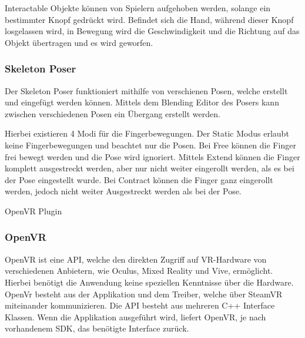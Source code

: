 \begin{itemize}
Interactable Objekte können von Spielern aufgehoben werden, solange ein bestimmter Knopf gedrückt wird.
Befindet sich die Hand, während dieser Knopf losgelassen wird, in Bewegung wird die Geschwindigkeit und die Richtung auf das Objekt übertragen und es wird geworfen.
~\cite{SteamVR_Interaction_System_2022}

\subsubsection{Skeleton Poser}
Der Skeleton Poser funktioniert mithilfe von verschienen Posen, welche erstellt und eingefügt werden können.
Mittels dem Blending Editor des Posers kann zwischen verschiedenen Posen ein Übergang erstellt werden.

Hierbei existieren 4 Modi für die Fingerbewegungen.
Der Static Modus erlaubt keine Fingerbewegungen und beachtet nur die Posen.
Bei Free können die Finger frei bewegt werden und die Pose wird ignoriert.
Mittels Extend können die Finger komplett ausgestreckt werden, aber nur nicht weiter eingerollt werden, als es bei der Pose eingestellt wurde.
Bei Contract können die Finger ganz eingerollt werden, jedoch nicht weiter Ausgestreckt werden als bei der Pose.
~\cite{SteamVR_Skeleton_Poser_2022}

OpenVR Plugin
\subsubsection{OpenVR}
OpenVR ist eine API, welche den direkten Zugriff auf VR-Hardware von verschiedenen Anbietern, wie Oculus, Mixed Reality und Vive, ermöglicht.
Hierbei benötigt die Anwendung keine speziellen Kenntnisse über die Hardware.
OpenVr besteht aus der Applikation und dem Treiber, welche über SteamVR miteinander kommunizieren.
Die API besteht aus mehreren C++ Interface Klassen.
Wenn die Applikation ausgeführt wird, liefert OpenVR, je nach vorhandenem SDK, das benötigte Interface zurück.
~\cite{OpenVR_Github_Documentation_2020}


\end{itemize}
